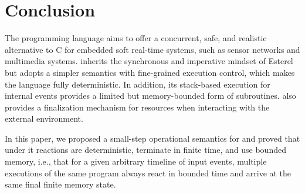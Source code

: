\section{Conclusion}
\label{sec.conclusion}

The programming language \CEU aims to offer a concurrent, safe, and realistic
alternative to C for embedded soft real-time systems, such as sensor networks
and multimedia systems.
%
%
\CEU inherits the synchronous and imperative mindset of Esterel but adopts a
simpler semantics with fine-grained execution control, which makes the
language fully deterministic.
%
In addition, its stack-based execution for internal events provides a limited
but memory-bounded form of subroutines.
%
\CEU also provides a finalization mechanism for resources when interacting with
the external environment.

In this paper, we proposed a small-step operational semantics for
\CEU and proved that under it reactions are deterministic, terminate in
finite time, and use bounded memory, i.e., that for a given arbitrary
timeline of input events, multiple executions of the same program always
react in bounded time and arrive at the same final finite memory state.
